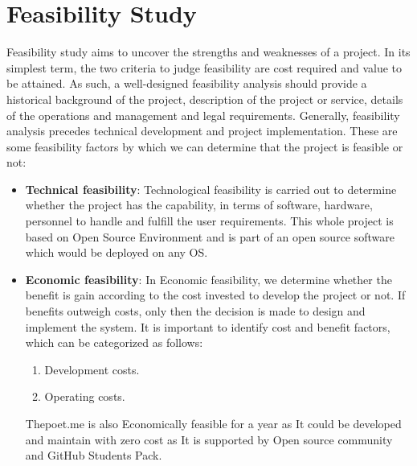 \section{Feasibility Study}
Feasibility study aims to uncover the strengths and weaknesses of
a project. In its simplest term, the two criteria to judge feasibility
are cost required and value to be attained. As such, a well-designed
feasibility analysis should provide a historical background of the
project, description of the project or service, details of the
operations and management and legal requirements. Generally, feasibility
analysis precedes technical development and project implementation.
These are some feasibility factors by which we can determine that
the project is feasible or not:
\begin{itemize}
\item {\bf{Technical feasibility}}: Technological feasibility is carried
out to determine whether the project has the capability, in terms of
software, hardware, personnel to handle and fulfill the user requirements. This whole project is based on Open
Source Environment and is part of an open source software which would be deployed on any OS.

\item {\bf{Economic feasibility}}: In Economic feasibility, we
determine whether the benefit is gain according to the cost invested
to develop the project or not. If benefits outweigh costs, only then
the decision is made to design and implement the system. It is
important to identify cost and benefit factors, which can be categorized
as follows:

\begin{enumerate}
\item Development costs.
\item Operating costs.
\end{enumerate}
Thepoet.me is also Economically feasible for a year as It could be developed and maintain with zero cost as It is supported by Open source community and GitHub Students Pack.
\end{itemize}



